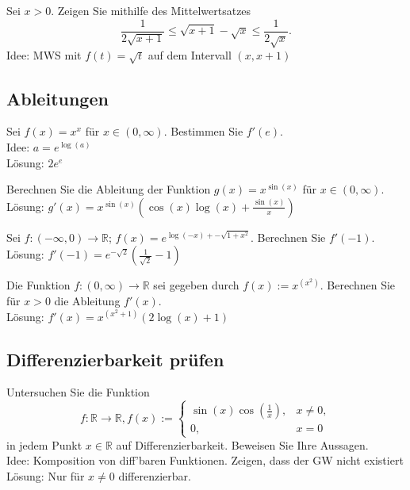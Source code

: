 \documentclass[parskip=full]{scrartcl}
\begin{document}
Sei $x > 0$.
Zeigen Sie mithilfe des Mittelwertsatzes
\begin{displaymath}
  \frac{1}{2\sqrt{x + 1}} \leq \sqrt{x + 1} - \sqrt{x} \leq \frac{1}{2\sqrt{x}}.
\end{displaymath}
Idee: MWS mit $f(t) = \sqrt{t}$ auf dem Intervall $(x, x+1)$

\subsection{Ableitungen}
Sei $f(x) = x^x$ für $x \in (0,\infty)$.
Bestimmen Sie $f'(e)$.\\
Idee: $a = e^{\log(a)}$\\
Lösung: $2e^e$

Berechnen Sie die Ableitung der Funktion $g(x) = x^{\sin(x)}$ für $x \in (0,\infty)$.\\
Lösung: $g'(x) = x^{\sin(x)} \left(\cos(x)\log(x) + \frac{\sin(x)}{x}\right)$

Sei $f : (-\infty, 0) \to \mathbb{R}$; $f(x) = e^{\log(-x) + - \sqrt{1 + x^2}}$.
Berechnen Sie $f'(-1)$.\\
Lösung: $f'(-1) = e^{-\sqrt{2}}\left(\frac{1}{\sqrt{2}} - 1\right)$

Die Funktion $f:(0,\infty) \to \mathbb{R}$ sei gegeben durch $f(x) := x^{(x^2)}$.
Berechnen Sie für $x > 0$ die Ableitung $f'(x)$.\\
Lösung: $f'(x) = x^{(x^2 + 1)} (2\log(x) + 1)$

\subsection{Differenzierbarkeit prüfen}
Untersuchen Sie die Funktion
\begin{displaymath}
  f:\mathbb{R} \to \mathbb{R}, f(x) :=
  \begin{cases}
    \sin(x)\cos\left(\frac{1}{x}\right),& x \neq 0,\\
    0,& x = 0
  \end{cases}
\end{displaymath}
in jedem Punkt $x \in \mathbb{R}$ auf Differenzierbarkeit.
Beweisen Sie Ihre Aussagen.\\
Idee: Komposition von diff'baren Funktionen. Zeigen, dass der GW nicht existiert\\
Lösung: Nur für $x \neq 0$ differenzierbar.
\end{document}

